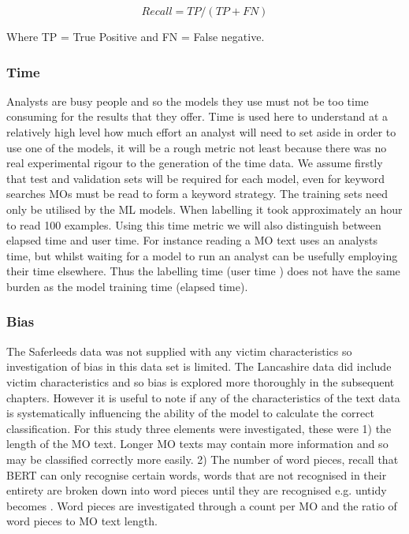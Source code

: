 \begin{equation}
 Recall = TP / (TP + FN)
 \label{eqn:recall}
\end{equation}

Where TP = True Positive and FN = False negative.


 \subsubsection{Time} Analysts are busy people and so the models they use must not be too time consuming for the results that they offer. Time is used here to understand at a relatively high level how much effort an analyst will need to set aside in order to use one of the models, it will be a rough metric not least because there was no real experimental rigour to the generation of the time data. We assume firstly that test and validation sets will be required for each model, even for keyword searches MOs must be read to form a keyword strategy. The training sets need only be utilised by the ML models. When labelling it took approximately an hour to read 100 examples. Using this time metric we will also distinguish between elapsed time and user time. For instance reading a MO text uses an analysts time, but whilst waiting for a model to run an analyst can be usefully employing their time elsewhere. Thus the labelling time (user time ) does not have the same burden as the model training time (elapsed time).
 
\subsubsection{Bias} \label{study1-bias}The Saferleeds data was not supplied with any victim characteristics so investigation of bias in this data set is limited. The Lancashire data did include victim characteristics and so bias is explored more thoroughly in the subsequent chapters. However it is useful to note if any of the characteristics of the text data is systematically influencing the ability of the model to calculate the correct classification. For this study three elements were investigated, these were 1) the length of the MO text. Longer MO texts may contain more information and so may be classified correctly more easily. 2) The number of word pieces, recall that BERT can only recognise certain words, words that are not recognised in their entirety are broken down into word pieces until they are recognised e.g. untidy becomes . Word pieces are investigated through a count per MO and the ratio of word pieces to MO text length.

